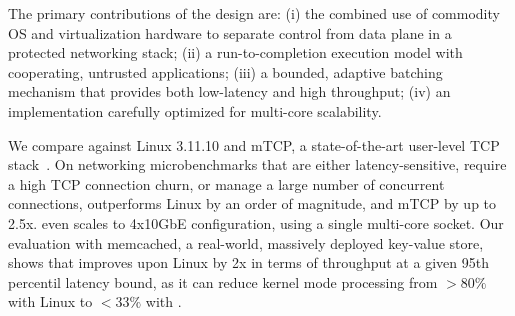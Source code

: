 
The primary contributions of the \ix design are: (i) the combined use
of commodity OS and virtualization hardware to separate control from
data plane in a protected networking stack; (ii) a run-to-completion
execution model with cooperating, untrusted applications; (iii) a
bounded, adaptive batching mechanism that provides both low-latency
and high throughput; (iv) an implementation carefully optimized for
multi-core scalability. 

We compare \ix against Linux 3.11.10 and mTCP, a state-of-the-art
user-level TCP stack~\cite{jeong2014mtcp}.  On networking
microbenchmarks that are either latency-sensitive, require a high TCP
connection churn, or manage a large number of concurrent connections,
\ix outperforms Linux by an order of magnitude, and mTCP by up to
2.5x.  \ix even scales to 4x10GbE configuration, using a single
multi-core socket.  Our evaluation with memcached, a real-world,
massively deployed key-value store, shows that \ix improves upon Linux
by  2x in terms of throughput at a given 95th
percentil latency bound, as it can reduce kernel mode processing from
$>80\%$ with Linux to $<33\%$ with \ix.





